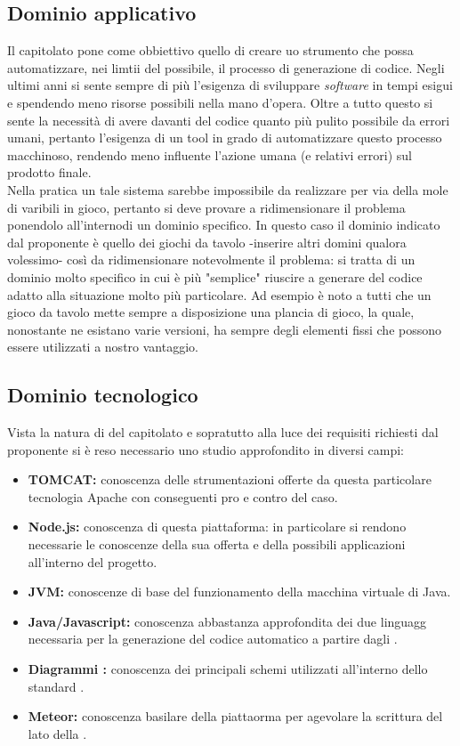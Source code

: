   \subsection{Dominio applicativo}
    Il capitolato pone come obbiettivo quello di creare uo strumento che possa automatizzare, nei limtii del possibile, il processo di generazione di codice.
    Negli ultimi anni si sente sempre di più l'esigenza di sviluppare \emph{software} in tempi esigui e spendendo meno risorse possibili nella mano d'opera.
    Oltre a tutto questo si sente la necessità di avere davanti del codice quanto più pulito possibile da errori umani, pertanto l'esigenza di un tool in grado di
    automatizzare questo processo macchinoso, rendendo meno influente l'azione umana (e relativi errori) sul prodotto finale. \\
    Nella pratica un tale sistema sarebbe impossibile da realizzare per via della mole di varibili in gioco, pertanto si deve provare a ridimensionare il problema ponendolo
    all'internodi un dominio specifico.
    In questo caso il dominio indicato dal proponente è quello dei giochi da tavolo -inserire altri domini qualora volessimo- così da ridimensionare notevolmente il problema:
    si tratta di un dominio molto specifico in cui è più "semplice" riuscire a generare del codice adatto alla situazione molto più particolare.
    Ad esempio è noto a tutti che un gioco da tavolo mette sempre a disposizione una plancia di gioco, la quale, nonostante ne esistano varie versioni, ha sempre degli
    elementi fissi che possono essere utilizzati a nostro vantaggio.
  \subsection{Dominio tecnologico}
    Vista la natura di  del capitolato e sopratutto alla luce dei requisiti richiesti dal proponente si è reso necessario uno studio approfondito in diversi campi:
      \begin{itemize}
        \item \textbf{ TOMCAT:} conoscenza delle strumentazioni offerte da questa particolare tecnologia Apache con conseguenti pro e contro del caso.
        \item \textbf{Node.js:} conoscenza di questa piattaforma: in particolare si rendono necessarie le conoscenze della sua offerta e della possibili applicazioni
        all'interno del progetto.
        \item \textbf{JVM:} conoscenze di base del funzionamento della macchina virtuale di Java.
        \item \textbf{Java/Javascript:} conoscenza abbastanza approfondita dei due linguagg necessaria per la generazione del codice automatico a partire dagli .
        \item \textbf{Diagrammi :} conoscenza dei principali schemi utilizzati all'interno dello standard .
        \item \textbf{Meteor:} conoscenza basilare della piattaorma per agevolare la scrittura del lato  della .
      \end{itemize}
